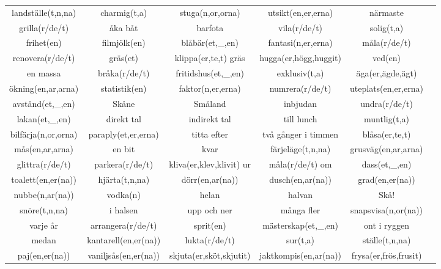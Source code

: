 
\begin{center}
    \begin{adjustwidth}{-2.4cm}{}
        \begin{tabular}{|c c c c c c|}
            \hline
            landställe(t,n,na) & charmig(t,a) & stuga(n,or,orna) & utsikt(en,er,erna) & närmaste &  \\
            grilla(r/de/t) & åka båt & barfota & vila(r/de/t) & solig(t,a) &  \\
            frihet(en) & filmjölk(en) & blåbär(et,\_,en) & fantasi(n,er,erna) & måla(r/de/t) &  \\
            renovera(r/de/t) & gräs(et) & klippa(er,te,t) gräs & hugga(er,högg,huggit) & ved(en) &  \\
            en massa & bråka(r/de/t) & fritidshus(et,\_,en) & exklusiv(t,a) & äga(er,ägde,ägt) &  \\
            ökning(en,ar,arna) & statistik(en) & faktor(n,er,erna) & numrera(r/de/t) & uteplats(en,er,erna) &  \\
            avstånd(et,\_,en) & Skåne & Småland & inbjudan & undra(r/de/t) &  \\
            lakan(et,\_,en) & direkt tal & indirekt tal & till lunch & muntlig(t,a) &  \\
            bilfärja(n,or,orna) & paraply(et,er,erna) & titta efter & två gånger i timmen & blåsa(er,te,t) &  \\
            mås(en,ar,arna) & en bit & kvar & färjeläge(t,n,na) & grusväg(en,ar,arna) &  \\
            glittra(r/de/t) & parkera(r/de/t) & kliva(er,klev,klivit) ur & måla(r/de/t) om & dass(et,\_,en) &  \\
            toalett(en,er(na)) & hjärta(t,n,na) & dörr(en,ar(na)) & dusch(en,ar(na)) & grad(en,er(na)) &  \\
            nubbe(n,ar(na)) & vodka(n) & helan & halvan & Skå! &  \\
            snöre(t,n,na) & i halsen & upp och ner & många fler & snapsvisa(n,or(na)) &  \\
            varje år & arrangera(r/de/t) & sprit(en) & mästerskap(et,\_,en) & ont i ryggen &  \\
            medan & kantarell(en,er(na)) & lukta(r/de/t) & sur(t,a) & ställe(t,n,na) &  \\
            paj(en,er(na)) & vaniljsås(en,er(na)) & skjuta(er,sköt,skjutit) & jaktkompis(en,ar(na)) & frysa(er,frös,frusit) &  \\

\end{tabular}
\end{adjustwidth}
\end{center}
